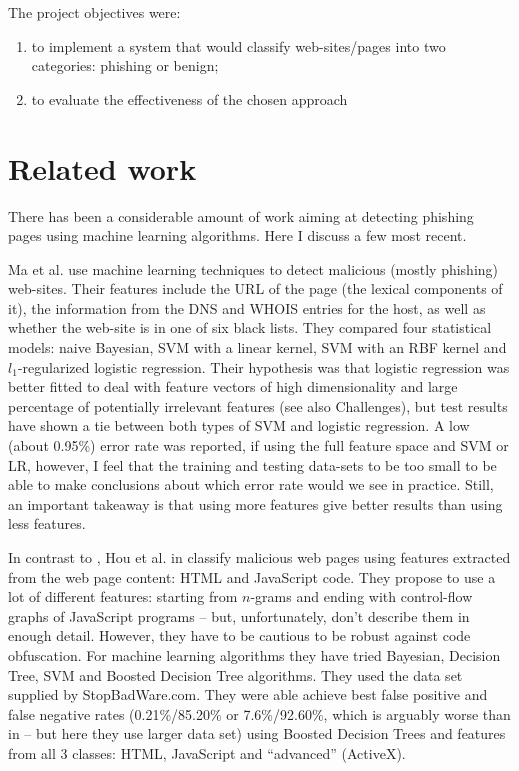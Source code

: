 \documentclass{article}
\begin{document}
The project objectives were:
\begin{enumerate}
\item to implement a system that would classify web-sites/pages into
  two categories: phishing or benign;
\item to evaluate the effectiveness of the chosen approach
\end{enumerate}

\section{Related work}
\label{sec:related-work}

There has been a considerable amount of work aiming at detecting
phishing pages using machine learning algorithms. Here I discuss a few
most recent.

Ma et al. \cite{MaSaul09} use machine learning techniques to detect
malicious (mostly phishing) web-sites. Their features include the URL
of the page (the lexical components of it), the information from the
DNS and WHOIS entries for the host, as well as whether the web-site is
in one of six black lists. They compared four statistical models:
naive Bayesian, SVM with a linear kernel, SVM with an RBF kernel and
$l_1$-regularized logistic regression. Their hypothesis was that
logistic regression was better fitted to deal with feature vectors of
high dimensionality and large percentage of potentially irrelevant
features (see also Challenges), but test results have shown a tie
between both types of SVM and logistic regression. A low (about
0.95\%) error rate was reported, if using the full feature space and
SVM or LR, however, I feel that the training and testing data-sets to
be too small to be able to make conclusions about which error rate
would we see in practice. Still, an important takeaway is that using
more features give better results than using less features.

In contrast to \cite{MaSaul09}, Hou et al. in \cite{HouChang10}
classify malicious web pages using features extracted from the web
page content: HTML and JavaScript code. They propose to use a lot of
different features: starting from $n$-grams and ending with
control-flow graphs of JavaScript programs -- but, unfortunately,
don't describe them in enough detail. However, they have to be
cautious to be robust against code obfuscation. For machine learning
algorithms they have tried Bayesian, Decision Tree, SVM and Boosted
Decision Tree algorithms. They used the data set supplied by
StopBadWare.com. They were able achieve best false positive and false
negative rates (0.21\%/85.20\% or 7.6\%/92.60\%, which is arguably
worse than in \cite{MaSaul09} -- but here they use larger data set)
using Boosted Decision Trees and features from all 3 classes: HTML,
JavaScript and ``advanced'' (ActiveX).
\end{document}
